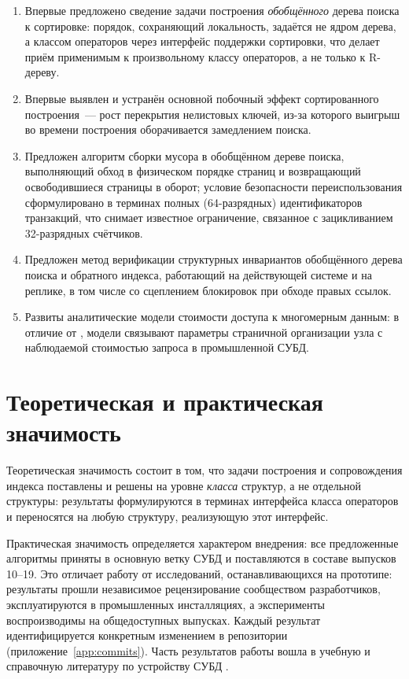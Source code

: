\begin{enumerate}
\item Впервые предложено сведение задачи построения \emph{обобщённого} дерева
      поиска к сортировке: порядок, сохраняющий локальность, задаётся не ядром
      дерева, а классом операторов через интерфейс поддержки сортировки, что
      делает приём применимым к произвольному классу операторов, а не только к
      R-дереву.
\item Впервые выявлен и устранён основной побочный эффект сортированного
      построения~--- рост перекрытия нелистовых ключей, из-за которого выигрыш
      во времени построения оборачивается замедлением поиска.
\item Предложен алгоритм сборки мусора в обобщённом дереве поиска, выполняющий
      обход в физическом порядке страниц и возвращающий освободившиеся страницы
      в оборот; условие безопасности переиспользования сформулировано в терминах
      полных (64-разрядных) идентификаторов транзакций, что снимает известное
      ограничение, связанное с зацикливанием 32-разрядных счётчиков.
\item Предложен метод верификации структурных инвариантов обобщённого дерева
      поиска и обратного индекса, работающий на действующей системе и на реплике,
      в том числе со сцеплением блокировок при обходе правых ссылок.
\item Развиты аналитические модели стоимости доступа к многомерным данным: в
      отличие от \cite{borodin2011estimation}, модели связывают параметры
      страничной организации узла с наблюдаемой стоимостью запроса в
      промышленной СУБД.
\end{enumerate}

\section*{Теоретическая и практическая значимость}

Теоретическая значимость состоит в том, что задачи построения и сопровождения
индекса поставлены и решены на уровне \emph{класса} структур, а не отдельной
структуры: результаты формулируются в терминах интерфейса класса операторов и
переносятся на любую структуру, реализующую этот интерфейс.

Практическая значимость определяется характером внедрения: все предложенные
алгоритмы приняты в основную ветку СУБД \pg{} и поставляются в составе выпусков
10--19. Это отличает работу от исследований, останавливающихся на прототипе:
результаты прошли независимое рецензирование сообществом разработчиков,
эксплуатируются в промышленных инсталляциях, а эксперименты воспроизводимы на
общедоступных выпусках. Каждый результат идентифицируется конкретным
изменением в репозитории (приложение~\ref{app:commits}). Часть результатов
работы вошла в учебную и справочную литературу по устройству СУБД
\cite{rogov2026}.

